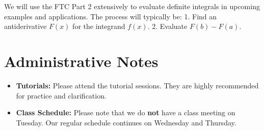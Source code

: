 We will use the FTC Part 2 extensively to evaluate definite integrals in upcoming examples and applications. The process will typically be:
1. Find an antiderivative $F(x)$ for the integrand $f(x)$.
2. Evaluate $F(b) - F(a)$.

\section{Administrative Notes}

\begin{itemize}
    \item \textbf{Tutorials:} Please attend the tutorial sessions. They are highly recommended for practice and clarification.
    \item \textbf{Class Schedule:} Please note that we do \textbf{not} have a class meeting on Tuesday. Our regular schedule continues on Wednesday and Thursday.
\end{itemize}

